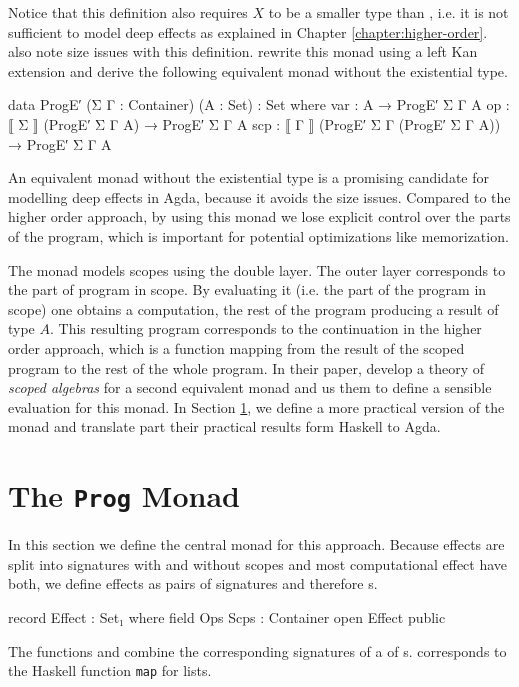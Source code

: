 Notice that this definition also requires $X$ to be a smaller type than
, i.e. it is not sufficient to model deep effects as
explained in Chapter \ref{chapter:higher-order}.
\textcite{DBLP:conf/lics/PirogSWJ18} also note size issues with this definition.
\textcite{DBLP:conf/lics/PirogSWJ18} rewrite this monad using a left Kan
extension and derive the following equivalent monad without the existential
type.

\begin{code}
data ProgE′ (Σ Γ : Container) (A : Set) : Set where
  var  :  A                                   → ProgE′ Σ Γ A
  op   :  ⟦ Σ  ⟧ (ProgE′ Σ Γ A)               → ProgE′ Σ Γ A
  scp  :  ⟦ Γ  ⟧ (ProgE′ Σ Γ (ProgE′ Σ Γ A))  → ProgE′ Σ Γ A
\end{code}
An equivalent monad without the existential type is a promising candidate for
modelling deep effects in Agda, because it avoids the size issues.
Compared to the higher order approach, by using this monad we lose explicit
control over the parts of the program, which is important for potential
optimizations like memorization.

The monad models scopes using the double  layer.
The outer layer corresponds to the part of program in scope.
By evaluating it (i.e. the part of the program in scope) one obtains a
computation, the rest of the program producing a result of type $A$.
This resulting program corresponds to the continuation in the higher order
approach, which is a function mapping from the result of the scoped program
to the rest of the whole program.
In their paper, \textcite{DBLP:conf/lics/PirogSWJ18} develop a theory of
\textit{scoped algebras} for a second equivalent monad and us them to define a
sensible evaluation for this monad.
In Section \ref{scoped-algebra:monad}, we define a more practical version of the
monad and translate part their practical results form Haskell to Agda. 


\section{The \texttt{Prog} Monad}
\label{scoped-algebra:monad}

In this section we define the central monad for this approach.
Because effects are split into signatures with and without scopes and most
computational effect have both, we define effects as pairs of signatures and
therefore s.

\begin{code}
record Effect : Set₁ where
  field Ops Scps : Container
open Effect public
\end{code}
The functions  and  combine the
corresponding signatures of a  of s.
 corresponds to the Haskell function \texttt{map} for lists.

